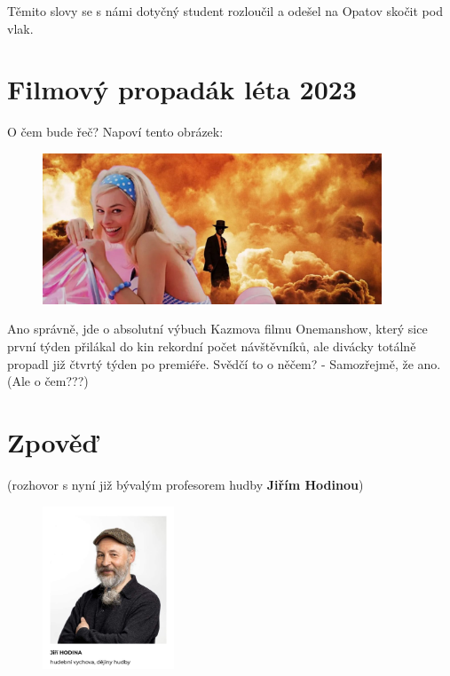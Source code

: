 \documentclass[twoside, 11pt]{article}
\begin{document}
Těmito slovy se s námi dotyčný student rozloučil a odešel na Opatov skočit pod vlak.

\section*{Filmový propadák léta 2023}

O čem bude řeč? Napoví tento obrázek:

\begin{figure}[htbp]
    \centering
    \includegraphics[width=0.9\textwidth]{barbie}
\end{figure}
\vspace*{-12pt}
{\scriptsize Ano správně, jde o absolutní výbuch Kazmova filmu Onemanshow, který sice první týden přilákal do kin rekordní počet návštěvníků, ale divácky totálně propadl již čtvrtý týden po premiéře. Svědčí to o něčem? - Samozřejmě, že ano. (Ale o čem???)}
\clearpage

\section*{Zpověď}
(rozhovor s nyní již bývalým profesorem hudby \textbf{Jiřím Hodinou})

\begin{figure}
    \vspace*{-24pt}
    \includegraphics[width=0.35\textwidth]{hodina}
\end{figure}
\end{document}
